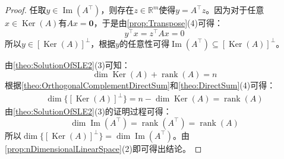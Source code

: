 \begin{proof}
	任取$y\in\operatorname{Im}(A^{\top})$，则存在$z\in\mathbb{R}^m$使得$y=A^{\top}z$。因为对于任意$x\in\operatorname{Ker}(A)$有$Ax=\mathbf{0}$，于是由\cref{prop:Transpose}(4)可得：
	\begin{equation*}
		y^{\top}x=z^{\top}Ax=0
	\end{equation*}
	所以$y\in[\operatorname{Ker}(A)]^\perp$，根据$y$的任意性可得$\operatorname{Im}(A^{\top})\subseteq[\operatorname{Ker}(A)]^\perp$。\par
	由\cref{theo:SolutionOfSLE2}(3)可知：
	\begin{equation*}
		\dim\operatorname{Ker}(A)+\operatorname{rank}(A)=n
	\end{equation*}
	根据\cref{theo:OrthogonalComplementDirectSum}和\cref{theo:DirectSum}(4)可得：
	\begin{align*}
		\dim\{[\operatorname{Ker}(A)]^\perp\}=n-\dim\operatorname{Ker}(A)=\operatorname{rank}(A)
	\end{align*}
	由\cref{theo:SolutionOfSLE2}(3)的证明过程可得：
	\begin{equation*}
		\dim\operatorname{Im}(A^{\top})=\operatorname{rank}(A^{\top})=\operatorname{rank}(A)
	\end{equation*}
	所以$\dim\{[\operatorname{Ker}(A)]^\perp\}=\dim\operatorname{Im}(A^{\top})$。由\cref{prop:nDimensionalLinearSpace}(2)即可得出结论。
\end{proof}
